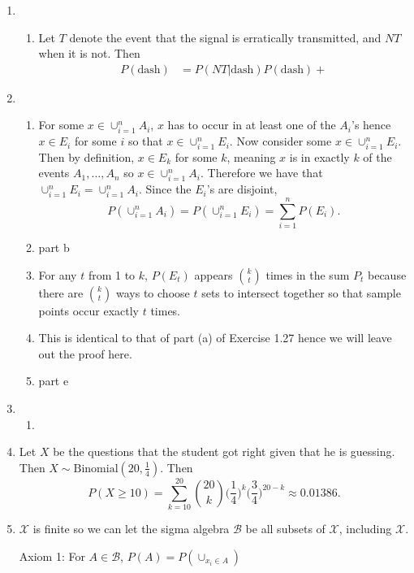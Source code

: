 \documentclass{article}
\begin{document}
\begin{enumerate}
    \item \begin{enumerate}
        \item Let $T$ denote the event that the signal is erratically transmitted, and $NT$ when
        it is not. Then
        \begin{align*}
            P(\text{dash})
            &= P(NT|\text{dash})P(\text{dash}) +
        \end{align*}
    \end{enumerate}

    \item \begin{enumerate}
        \item For some $x \in \cup_{i = 1}^{n} A_i$, $x$ has to occur in at least one of the 
        $A_i$'s hence $x \in E_i$ for some $i$ so that $x \in \cup_{i = 1}^{n} E_i$. Now 
        consider some $x \in \cup_{i = 1}^{n} E_i$. Then by definition, $x \in E_k$ for 
        some $k$, meaning $x$ is in exactly $k$ of the events $A_1, \dots, A_n$ so 
        $x \in \cup_{i = 1}^{n} A_i$. Therefore we have that 
        $\cup_{i = 1}^{n} E_i = \cup_{i = 1}^{n} A_i$. Since the $E_i$'s are disjoint, 
        \[ P(\cup_{i = 1}^{n} A_i) = P(\cup_{i = 1}^{n} E_i) = \sum_{i = 1}^{n} P(E_i). \]

        \item part b

        \item For any $t$ from 1 to $k$, $P(E_t)$ appears $\binom{k}{t}$ times in the sum 
        $P_t$ because there are $\binom{k}{t}$ ways to choose $t$ sets to intersect together 
        so that sample points occur exactly $t$ times.

        \item This is identical to that of part (a) of Exercise 1.27 hence we will leave out 
        the proof here.

        \item part e
    \end{enumerate}

    \item \begin{enumerate}
        \item 
    \end{enumerate}

    \item Let $X$ be the questions that the student got right given that he is guessing. Then 
    $X \sim \text{Binomial}(20, \frac{1}{4})$. Then
    \[ P(X \geq 10) = \sum_{k = 10}^{20} \binom{20}{k} \Big( \frac{1}{4} \Big)^{k} 
    \Big( \frac{3}{4} \Big)^{20 - k} \approx 0.01386. \]

    \item $\mathcal{X}$ is finite so we can let the sigma algebra $\mathcal{B}$ be all subsets 
    of $\mathcal{X}$, including $\mathcal{X}$.

    Axiom 1: For $A \in \mathcal{B}$, $P(A) = P(\cup_{x_i \in A} )$
\end{enumerate}
\end{document}
